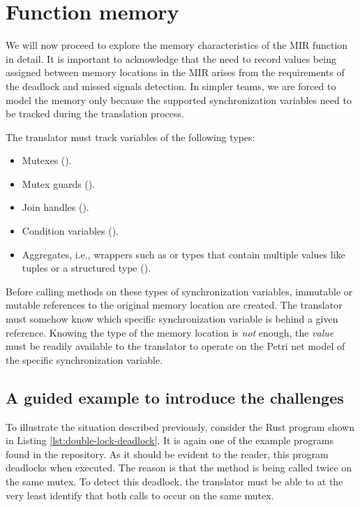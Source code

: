 \section{Function memory}

We will now proceed to explore the memory characteristics
of the \acrshort{MIR} function in detail.
It is important to acknowledge that
the need to record values being assigned between memory locations in the \acrshort{MIR} arises
from the requirements of the deadlock and missed signals detection.
In simpler teams, we are forced to model the memory only
because the supported synchronization variables need to be tracked
during the translation process.

The translator must track variables of the following types:

\begin{itemize}
  \item Mutexes ().
  \item Mutex guards ().
  \item Join handles ().
  \item Condition variables ().
  \item Aggregates, i.e., wrappers such as  or
        types that contain multiple values like tuples or a structured type ().
\end{itemize}

Before calling methods on these types of synchronization variables,
immutable or mutable references to the original memory location are created.
The translator must somehow know
which specific synchronization variable is behind a given reference.
Knowing the type of the memory location is \emph{not} enough,
the \emph{value} must be readily available to the translator
to operate on the Petri net model of the specific synchronization variable.

\subsection{A guided example to introduce the challenges}

To illustrate the situation described previously, consider the Rust program
shown in Listing \ref{lst:double-lock-deadlock}.
It is again one of the example programs found in the repository.
As it should be evident to the reader, this program deadlocks when executed.
The reason is that the  method is
being called twice on the same mutex.
To detect this deadlock, the translator must be able to at the very least
identify that both calls to  occur on the same mutex.

